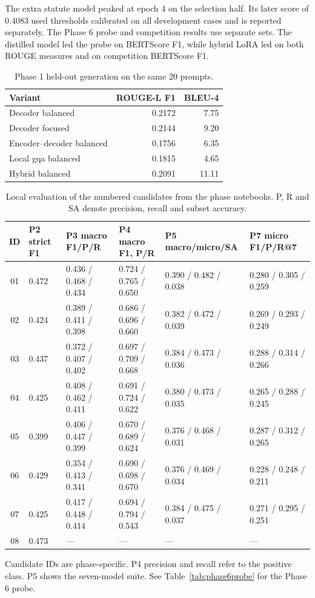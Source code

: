 \documentclass[11pt, oneside]{article}
\begin{document}
The extra statute model peaked at epoch 4 on the selection half. Its later score of 0.4083 used thresholds calibrated on all development cases and is reported separately. The Phase 6 probe and competition results use separate sets. The distilled model led the probe on BERTScore F1, while hybrid LoRA led on both ROUGE measures and on competition BERTScore F1.



\begin{table}[H]
\centering\small
\caption{Phase 1 held-out generation on the same 20 prompts.}
\begin{tabular}{@{}lrr@{}}
\toprule
Variant & ROUGE-L F1 & BLEU-4 \\
\midrule
Decoder balanced & 0.2172 & 7.75 \\
Decoder focused & 0.2144 & 9.20 \\
Encoder--decoder balanced & 0.1756 & 6.35 \\
Local gqa balanced & 0.1815 & 4.65 \\
Hybrid balanced & 0.2091 & 11.11 \\
\bottomrule
\end{tabular}
\end{table}

\begin{table}[H]
\centering\scriptsize
\setlength{\tabcolsep}{4pt}
\caption{Local evaluation of the numbered candidates from the phase notebooks. P, R and SA denote precision, recall and subset accuracy.}
\begin{tabular}{@{}clllll@{}}
\toprule
ID & P2 strict F1 & P3 macro F1/P/R & P4 macro F1, P/R & P5 macro/micro/SA & P7 micro F1/P/R@7 \\
\midrule
01 & 0.472 & 0.436 / 0.468 / 0.434 & 0.724 / 0.765 / 0.650 & 0.390 / 0.482 / 0.038 & 0.280 / 0.305 / 0.259 \\
02 & 0.424 & 0.389 / 0.411 / 0.398 & 0.686 / 0.696 / 0.660 & 0.382 / 0.472 / 0.039 & 0.269 / 0.293 / 0.249 \\
03 & 0.437 & 0.372 / 0.407 / 0.402 & 0.697 / 0.709 / 0.668 & 0.384 / 0.473 / 0.036 & 0.288 / 0.314 / 0.266 \\
04 & 0.425 & 0.408 / 0.462 / 0.411 & 0.691 / 0.724 / 0.622 & 0.380 / 0.473 / 0.035 & 0.265 / 0.288 / 0.245 \\
05 & 0.399 & 0.406 / 0.447 / 0.399 & 0.670 / 0.689 / 0.624 & 0.376 / 0.468 / 0.031 & 0.287 / 0.312 / 0.265 \\
06 & 0.429 & 0.354 / 0.413 / 0.341 & 0.690 / 0.698 / 0.670 & 0.376 / 0.469 / 0.034 & 0.228 / 0.248 / 0.211 \\
07 & 0.425 & 0.417 / 0.448 / 0.414 & 0.694 / 0.794 / 0.543 & 0.384 / 0.475 / 0.037 & 0.271 / 0.295 / 0.251 \\
08 & 0.473 & --- & --- & --- & --- \\
\bottomrule
\end{tabular}

\smallskip
\parbox{\linewidth}{\footnotesize Candidate IDs are phase-specific. P4 precision and recall refer to the positive class. P5 shows the seven-model suite. See Table~\ref{tab:phase6probe} for the Phase 6 probe.}
\end{table}
\end{document}
